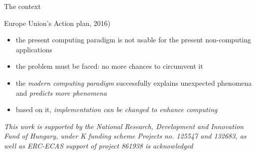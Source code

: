 

{
\articleonly{} 

\articleonly{
}	
	The context
}%


{
	{Europe Union’s Action plan, 2016)}
}	

{
	\begin{itemize}
		\item the present computing paradigm is not usable for the present non-computing applications
		\item the problem must be faced: no more chances to circumvent it 
		\item the \textit{modern computing paradigm} 		successfully explains unexpected phenomena
		and \textit{predicts more phenomena}
		\item based on it, \textit{implementation can be changed
			to enhance computing}
	\end{itemize}
	\vspace{.5 cm}	\pause
	\textit{
		This work is supported by the National
		Research, Development and Innovation Fund of
		Hungary, under  K funding scheme Projects no. 125547 and 132683, as well as ERC-ECAS support of project 861938 is acknowledged	}
}

